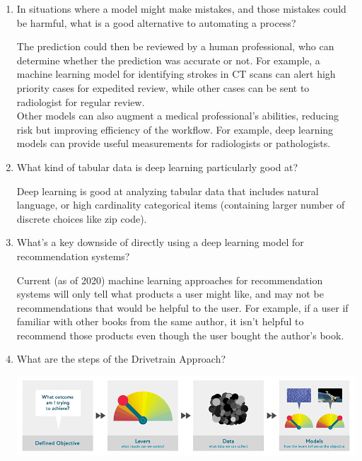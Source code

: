 \documentclass[12pt,a4paper]{article}
\begin{document}
\begin{enumerate}
\bigbreak

\item In situations where a model might make mistakes, and those mistakes could be harmful, what is a good alternative to automating a process? \\

\smallbreak

The prediction could then be reviewed by a human professional, who can determine whether the prediction was accurate or not. For example, a machine learning model for identifying strokes in CT scans can alert high priority cases for expedited review, while other cases can be sent to radiologist for regular review. \\
\smallbreak
Other models can also augment a medical professional's abilities, reducing risk but improving efficiency of the workflow. For example, deep learning models can provide useful measurements for radiologists or pathologists.

\bigbreak

\item What kind of tabular data is deep learning particularly good at? \\

\smallbreak

Deep learning is good at analyzing tabular data that includes natural language, or high cardinality categorical items (containing larger number of discrete choices like zip code).

\bigbreak

\item What's a key downside of directly using a deep learning model for recommendation systems? \\

\smallbreak

Current (as of 2020) machine learning approaches for recommendation systems will only tell what products a user might like, and may not be recommendations that would be helpful to the user. For example, if a user if familiar with other books from the same author, it isn't helpful to recommend those products even though the user bought the author's book. 

\bigbreak

\item What are the steps of the Drivetrain Approach? \\

\smallbreak

\includegraphics[scale=0.5]{drivetrain.png}


\end{enumerate}
\end{document}
